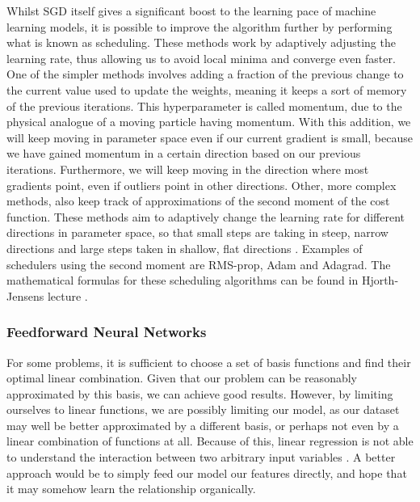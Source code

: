 \documentclass[onecolumn,10pt,cleanfoot]{asme2ej}
\begin{document}
Whilst SGD itself gives a significant boost to the learning pace of machine learning models, it is possible to improve the algorithm further by performing what is known as scheduling. These methods work by adaptively adjusting the learning rate, thus allowing us to avoid local minima and converge even faster. One of the simpler methods involves adding a fraction of the previous change to the current value used to update the weights, meaning it keeps a sort of memory of the previous iterations. This hyperparameter is called momentum, due to the physical analogue of a moving particle having momentum. With this addition, we will keep moving in parameter space even if our current gradient is small, because we have gained momentum in a certain direction based on our previous iterations. Furthermore, we will keep moving in the direction where most gradients point, even if outliers point in other directions. Other, more complex methods, also keep track of approximations of the second moment of the cost function. These methods aim to adaptively change the learning rate for different directions in parameter space, so that small steps are taking in steep, narrow directions and large steps taken in shallow, flat directions \cite{mortensched}. Examples of schedulers using the second moment are RMS-prop, Adam and Adagrad. The mathematical formulas for these scheduling algorithms can be found in Hjorth-Jensens lecture \cite{mortensched}.

\subsubsection{Feedforward Neural Networks}

For some problems, it is sufficient to choose a set of basis functions and find their optimal linear combination. Given that our problem can be reasonably approximated by this basis, we can achieve good results. However, by limiting ourselves to linear functions, we are possibly limiting our model, as our dataset may well be better approximated by a different basis, or perhaps not even by a linear combination of functions at all. Because of this, linear regression is not able to understand the interaction between two arbitrary input variables \cite[165]{gbc}. A better approach would be to simply feed our model our features directly, and hope that it may somehow learn the relationship organically.
\end{document}
